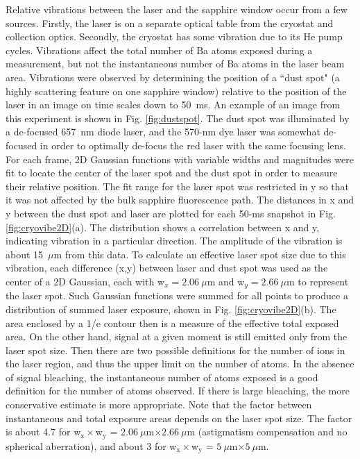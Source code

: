 Relative vibrations between the laser and the sapphire window occur from a few sources.  Firstly, the laser is on a separate optical table from the cryostat and collection optics.  Secondly, the cryostat has some vibration due to its He pump cycles.  Vibrations affect the total number of Ba atoms exposed during a measurement, but not the instantaneous number of Ba atoms in the laser beam area.  Vibrations were observed by determining the position of a ``dust spot" (a highly scattering feature on one sapphire window) relative to the position of the laser in an image on time scales down to 50~ms.  An example of an image from this experiment is shown in Fig. \ref{fig:dustspot}.  The dust spot was illuminated by a de-focused 657~nm diode laser, and the 570-nm dye laser was somewhat de-focused in order to optimally de-focus the red laser with the same focusing lens. For each frame, 2D Gaussian functions with variable widths and magnitudes were fit to locate the center of the laser spot and the dust spot in order to measure their relative position.  The fit range for the laser spot was restricted in y so that it was not affected by the bulk sapphire fluorescence path.  The distances in x and y between the dust spot and laser are plotted for each 50-ms snapshot in Fig. \ref{fig:cryovibe2D}(a).  The distribution shows a correlation between x and y, indicating vibration in a particular direction.  The amplitude of the vibration is about 15~$\mu$m from this data.  To calculate an effective laser spot size due to this vibration, each difference (x,y) between laser and dust spot was used as the center of a 2D Gaussian, each with w$_{x} = 2.06~\mu$m and w$_{y} = 2.66~\mu$m to represent the laser spot.  Such Gaussian functions were summed for all points to produce a distribution of summed laser exposure, shown in Fig. \ref{fig:cryovibe2D}(b).  The area enclosed by a 1/e contour then is a measure of the effective total exposed area.  On the other hand, signal at a given moment is still emitted only from the laser spot size.  Then there are two possible definitions for the number of ions in the laser region, and thus the upper limit on the number of atoms.  In the absence of signal bleaching, the instantaneous number of atoms exposed is a good definition for the number of atoms observed.  If there is large bleaching, the more conservative estimate is more appropriate.  Note that the factor between instantaneous and total exposure areas depends on the laser spot size.  The factor is about 4.7 for w$_{\text{x}} \times $w$_{\text{y}}$ = $2.06~\mu$m$ \times 2.66~\mu$m (astigmatism compensation and no spherical aberration), and about 3 for w$_{\text{x}} \times $w$_{\text{y}}$ = $5~\mu$m$ \times 5~\mu$m.

